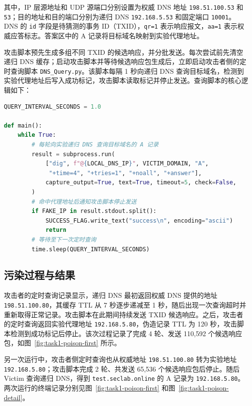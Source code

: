 其中，IP 层源地址和 UDP 源端口分别设置为权威 DNS 地址 \texttt{198.51.100.53} 和 \texttt{53}；目的地址和目的端口分别为递归 DNS \texttt{192.168.5.53} 和固定端口 \texttt{10001}。DNS 的 \texttt{id} 字段是待猜测的事务 ID（TXID），\texttt{qr=1} 表示响应报文，\texttt{aa=1} 表示权威应答标志。答案区中的 A 记录将目标域名映射到实验代理地址。


攻击脚本预先生成多组不同 TXID 的候选响应，并分批发送。每次尝试前先清空递归 DNS 缓存；启动攻击脚本并等待候选响应包生成后，立即启动攻击者侧的定时查询脚本 \texttt{DNS\_Query.py}。该脚本每隔 1 秒向递归 DNS 查询目标域名，检测到实验代理地址后写入成功标记，攻击脚本读取标记并停止发送。查询脚本的核心逻辑如下：

\begin{samepage}
\begin{lstlisting}[language=Python,caption={攻击者定时查询及污染成功判断}]
QUERY_INTERVAL_SECONDS = 1.0

def main():
    while True:
        # 每轮向实验递归 DNS 查询目标域名的 A 记录
        result = subprocess.run(
            ["dig", f"@{LOCAL_DNS_IP}", VICTIM_DOMAIN, "A",
             "+time=4", "+tries=1", "+noall", "+answer"],
            capture_output=True, text=True, timeout=5, check=False,
        )
        # 命中代理地址后通知攻击脚本停止发送
        if FAKE_IP in result.stdout.split():
            SUCCESS_FLAG.write_text("success\n", encoding="ascii")
            return
        # 等待至下一次定时查询
        time.sleep(QUERY_INTERVAL_SECONDS)
\end{lstlisting}
\end{samepage}

\subsection{污染过程与结果}

攻击者的定时查询记录显示，递归 DNS 最初返回权威 DNS 提供的地址 \texttt{198.51.100.80}，其缓存 TTL 从 7 秒逐步递减至 1 秒，随后出现一次查询超时并重新取得正常记录。攻击脚本在此期间持续发送 TXID 候选响应。之后，攻击者的定时查询返回实验代理地址 \texttt{192.168.5.80}，伪造记录 TTL 为 120 秒，攻击脚本检测到成功标记后停止。该次过程记录了完成 4 轮、发送 110{,}592 个候选响应包，如图~\ref{fig:task1-poison-first} 所示。

另一次运行中，攻击者侧定时查询也从权威地址 \texttt{198.51.100.80} 转为实验地址 \texttt{192.168.5.80}；攻击脚本完成 2 轮、共发送 65{,}536 个候选响应包后停止。随后 Victim 查询递归 DNS，得到 \texttt{test.seclab.online} 的 A 记录为 \texttt{192.168.5.80}。两次运行的终端记录分别见图~\ref{fig:task1-poison-first} 和图~\ref{fig:task1-poison-detail}。

